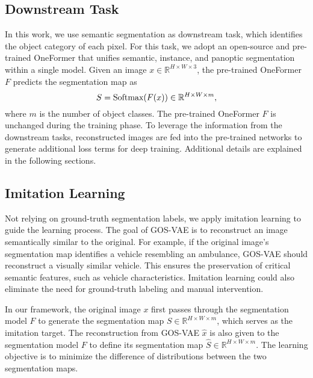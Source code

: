 \vspace*{-2mm}
\subsection{Downstream Task}
In this work, we use semantic segmentation as downstream task, which identifies the object category of each pixel. For this task, we adopt an open-source and pre-trained OneFormer \cite{jain2023oneformer} that unifies semantic, instance, and panoptic segmentation within a single model. Given an image $x \in \mathbb{R}^{H \times W \times 3}$, the pre-trained OneFormer $F$ predicts the segmentation map as
\begin{equation}
\vspace*{-2mm}
S = \mbox{Softmax}(F(x)) \in \mathbb{R}^{H \times W \times m},
\end{equation}
where $m$ is the number of object classes. The pre-trained OneFormer $F$ is unchanged during the training phase. To leverage the information from the downstream tasks, 
reconstructed images are fed into the pre-trained networks to generate additional loss terms for deep training. Additional details are explained in the following sections.



\vspace*{-2mm}

\subsection{Imitation Learning} \label{sec:il}
Not relying on ground-truth segmentation labels, we apply imitation learning \cite{xu2023bits} to guide the learning process. The goal of GOS-VAE is to reconstruct an image semantically similar to the original. For example, if the original image’s segmentation map identifies a vehicle resembling an ambulance, GOS-VAE should reconstruct a visually similar vehicle. This ensures the preservation of critical semantic features, such as vehicle characteristics. Imitation learning could also eliminate the need for ground-truth labeling and manual intervention.

In our framework, the original image $x$ first passes through the segmentation model $F$ to generate the segmentation map $S \in \mathbb{R}^{H \times W \times m}$, which serves as the imitation target. The reconstruction from GOS-VAE $\hat{x}$ is also given to the segmentation model $F$ to define its segmentation map $\hat{S} \in \mathbb{R}^{H \times W \times m}$. The learning objective is to minimize the difference of distributions between the two segmentation maps.

